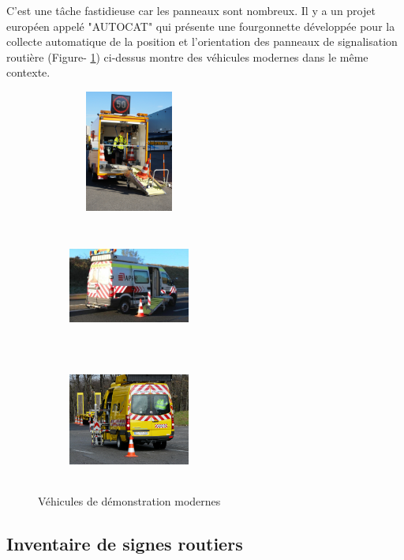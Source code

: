 C'est une tâche fastidieuse car les panneaux sont nombreux. Il y a un projet européen appelé "AUTOCAT" \cite{2} qui présente une fourgonnette développée pour la collecte automatique de la position et l'orientation des panneaux de signalisation routière (Figure- \ref{fig:vehicules de}) ci-dessus montre des véhicules modernes dans le même contexte.

\begin{figure}[h]
        \centering
        \begin{subfigure}
        \centering
        \includegraphics[width=4cm,height=4cm]{images/c1.png}  \end{subfigure}
         \begin{subfigure}
         \centering
        \includegraphics[width=4cm,height=4cm]{images/c2.png}
        \end{subfigure}
        \begin{subfigure}
        \centering
        \includegraphics[width=4cm,height=4cm]{images/c4.jpg} \end{subfigure}
        \caption{Véhicules de démonstration modernes}
        \label{fig:vehicules de}
\end{figure}
    
\subsection{Inventaire de signes routiers}


